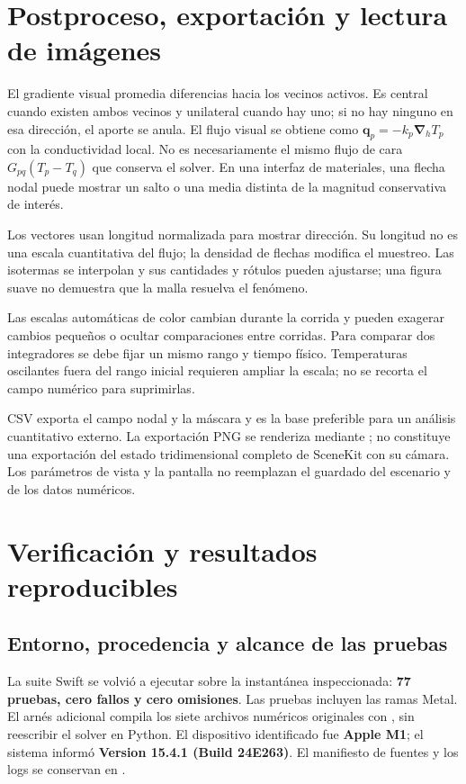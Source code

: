 \documentclass[11pt,a4paper]{article}
\newcommand{\code}[1]{\texttt{\detokenize{#1}}}
\begin{document}
\section{Postproceso, exportación y lectura de imágenes}
El gradiente visual promedia diferencias hacia los vecinos activos. Es central
cuando existen ambos vecinos y unilateral cuando hay uno; si no hay ninguno
en esa dirección, el aporte se anula. El flujo visual se obtiene como
$\boldsymbol q_p=-k_p\boldsymbol{\nabla}_hT_p$ con la conductividad local.
No es necesariamente el mismo flujo de cara $G_{pq}(T_p-T_q)$ que conserva
el solver. En una interfaz de materiales, una flecha nodal puede mostrar un
salto o una media distinta de la magnitud conservativa de interés.

Los vectores usan longitud normalizada para mostrar dirección. Su longitud
no es una escala cuantitativa del flujo; la densidad de flechas modifica el
muestreo. Las isotermas se interpolan y sus cantidades y rótulos pueden
ajustarse; una figura suave no demuestra que la malla resuelva el fenómeno.

Las escalas automáticas de color cambian durante la corrida y pueden exagerar
cambios pequeños o ocultar comparaciones entre corridas. Para comparar dos
integradores se debe fijar un mismo rango y tiempo físico. Temperaturas
oscilantes fuera del rango inicial requieren ampliar la escala; no se recorta
el campo numérico para suprimirlas.

CSV exporta el campo nodal y la máscara y es la base preferible para un
análisis cuantitativo externo. La exportación PNG se renderiza mediante
\code{ThermalCanvas}; no constituye una exportación del estado tridimensional
completo de SceneKit con su cámara. Los parámetros de vista y la pantalla no
reemplazan el guardado del escenario y de los datos numéricos.

\FloatBarrier
\section{Verificación y resultados reproducibles}
\label{sec:results}
\subsection{Entorno, procedencia y alcance de las pruebas}
La suite Swift se volvió a ejecutar sobre la instantánea inspeccionada:
\textbf{77 pruebas, cero fallos y cero omisiones}. Las pruebas incluyen las
ramas Metal. El arnés adicional compila los siete archivos numéricos originales
con \code{swiftc -O}, sin reescribir el solver en Python. El dispositivo
identificado fue \textbf{Apple M1}; el sistema informó \textbf{Version 15.4.1 (Build 24E263)}.
El manifiesto de fuentes y los logs se conservan en \code{data/}.
\end{document}
